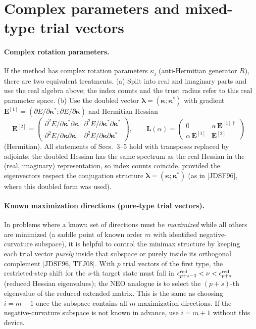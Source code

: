 \documentclass[11pt,a4paper]{article}
\newcommand{\bL}{\mathbf{L}}
\newcommand{\bk}{\boldsymbol{\kappa}}
\newcommand{\blam}{\boldsymbol{\lambda}}
\begin{document}
\section{Complex parameters and mixed-type trial vectors}\label{sec:complex}
\paragraph{Complex rotation parameters.} If the method has complex rotation parameters $\kappa_j$ (anti-Hermitian generator $R$), there are two equivalent treatments.
(a) Split into real and imaginary parts and use the real algebra above; the index counts and the trust radius refer to this real parameter space. (b) Use the doubled vector $\blam=(\bk;\bk^*)$ with gradient $\mathbf E^{[1]}=(\partial E/\partial\bk^*;\partial E/\partial\bk)$ and Hermitian Hessian
\begin{equation}
 \mathbf E^{[2]}=\begin{pmatrix}\partial^2E/\partial\bk^*\partial\bk&\partial^2E/\partial\bk^*\partial\bk^*\\ \partial^2E/\partial\bk\partial\bk&\partial^2E/\partial\bk\partial\bk^*\end{pmatrix},\qquad
 \bL(\alpha)=\begin{pmatrix}0&\alpha\,\mathbf E^{[1]\dagger}\\ \alpha\,\mathbf E^{[1]}&\mathbf E^{[2]}\end{pmatrix}
\end{equation}
(Hermitian). All statements of Secs.~3--5 hold with transposes replaced by adjoints; the doubled Hessian has the same spectrum as the real Hessian in the (real, imaginary) representation, so index counts coincide, provided the eigenvectors respect the conjugation structure $\blam=(\bk;\bk^*)$ (as in [JDSF96], where this doubled form was used).

\paragraph{Known maximization directions (pure-type trial vectors).} In problems where a known set of directions must be \emph{maximized} while all others are minimized (a saddle point of known order $m$ with identified negative-curvature subspace), it is helpful to control the minimax structure by keeping each trial vector \emph{purely} inside that subspace or purely inside its orthogonal complement [JDSF96, TFJ08]. With $p$ trial vectors of the first type, the restricted-step shift for the $s$-th target state must fall in $\epsilon^{\rm red}_{p+s-1}<\nu<\epsilon^{\rm red}_{p+s}$ (reduced Hessian eigenvalues); the NEO analogue is to select the $(p+s)$-th eigenvalue of the reduced extended matrix. This is the same as choosing $i=m+1$ once the subspace contains all $m$ maximization directions. If the negative-curvature subspace is not known in advance, use $i=m+1$ without this device.
\end{document}
